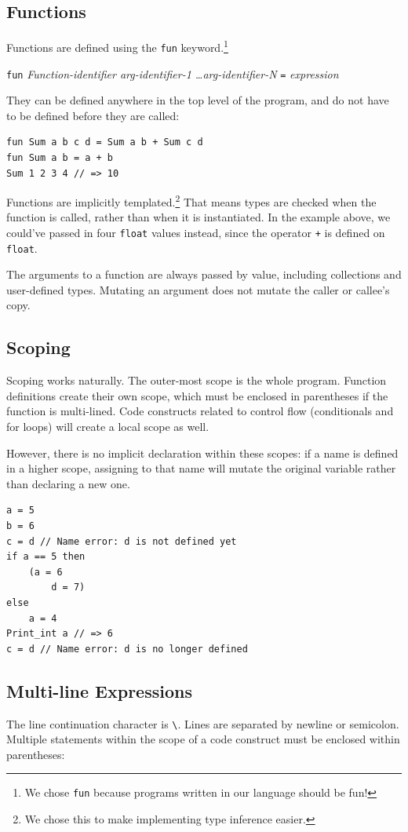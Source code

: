 \documentclass[11pt, onecolumn, letterpaper]{article}
\begin{document}
\subsection{Functions}
Functions are defined using the \texttt{fun} keyword.\footnote{We chose \texttt{fun} because programs written in our language should be fun!} 

\texttt{fun} \textit{Function-identifier arg-identifier-1 \ldots arg-identifier-N} \texttt{=} \textit{expression}

They can be defined anywhere in the top level of the program, and do not have to be defined before they are called:

\begin{lstlisting}
fun Sum a b c d = Sum a b + Sum c d
fun Sum a b = a + b
Sum 1 2 3 4 // => 10
\end{lstlisting}

Functions are implicitly templated.\footnote{We chose this to make implementing type inference easier.} That means types are checked when the function is called, rather than when it is instantiated. In the example above, we could've passed in four \texttt{float} values instead, since the operator \texttt{+} is defined on \texttt{float}.

The arguments to a function are always passed by value, including collections and user-defined types. Mutating an argument does not mutate the caller or callee's copy.

\subsection{Scoping}
Scoping works naturally. The outer-most scope is the whole program. Function definitions create their own scope, which must be enclosed in parentheses if the function is multi-lined. Code constructs related to control flow (conditionals and for loops) will create a local scope as well.

However, there is no implicit declaration within these scopes: if a name is defined in a higher scope, assigning to that name will mutate the original variable rather than declaring a new one.

\begin{lstlisting} 
a = 5
b = 6
c = d // Name error: d is not defined yet
if a == 5 then
    (a = 6  
        d = 7)
else
    a = 4
Print_int a // => 6
c = d // Name error: d is no longer defined
\end{lstlisting}

\subsection{Multi-line Expressions}
The line continuation character is \texttt{\textbackslash}. Lines are separated by newline or semicolon. Multiple statements within the scope of a code construct must be enclosed within parentheses:
\end{document}
